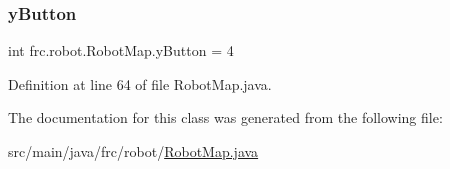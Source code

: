 \subsubsection{\texorpdfstring{y\+Button}{yButton}}
{\footnotesize\ttfamily int frc.\+robot.\+Robot\+Map.\+y\+Button = 4\hspace{0.3cm}{\ttfamily [static]}}



Definition at line 64 of file Robot\+Map.\+java.



The documentation for this class was generated from the following file\+:\begin{DoxyCompactItemize}
\item 
src/main/java/frc/robot/\hyperlink{_robot_map_8java}{Robot\+Map.\+java}\end{DoxyCompactItemize}
